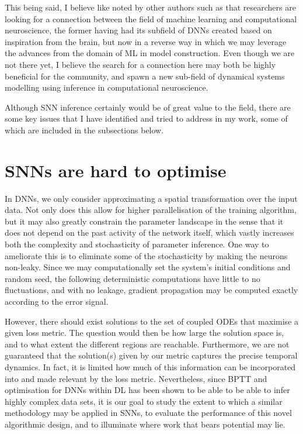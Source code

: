 \documentclass[mphil,deptreport,ai]{infthesis} %
\begin{document}
This being said, I believe like noted by other authors such as \cite{Sindaci2018StatisticalFunction} that researchers are looking for a connection between the field of machine learning and computational neuroscience, the former having had its subfield of DNNs created based on inspiration from the brain, but now in a reverse way in which we may leverage the advances from the domain of ML in model construction.
Even though we are not there yet, I believe the search for a connection here may both be highly beneficial for the community, and spawn a new sub-field of dynamical systems modelling using inference in computational neuroscience.

Although SNN inference certainly would be of great value to the field, there are some key issues that I have identified and tried to address in my work, some of which are included in the subsections below.

\section{SNNs are hard to optimise}
In DNNs, we only consider approximating a spatial transformation over the input data. Not only does this allow for higher parallelisation of the training algorithm, but it may also greatly constrain the parameter landscape in the sense that it does not depend on the past activity of the network itself, which vastly increases both the complexity and stochasticity of parameter inference. 
One way to ameliorate this is to eliminate some of the stochasticity by making the neurons non-leaky. Since we may computationally set the system’s initial conditions and random seed, the following deterministic computations have little to no fluctuations, and with no leakage, gradient propagation may be computed exactly according to the error signal.

However, there should exist solutions to the set of coupled ODEs that maximise a given loss metric. The question would then be how large the solution space is, and to what extent the different regions are reachable. Furthermore, we are not guaranteed that the solution(s) given by our metric captures the precise temporal dynamics. In fact, it is limited how much of this information can be incorporated into and made relevant by the loss metric.
Nevertheless, since BPTT and optimisation for DNNs within DL has been shown to be able to be able to infer highly complex data sets, it is our goal to study the extent to which a similar methodology may be applied in SNNs, to evaluate the performance of this novel algorithmic design, and to illuminate where work that bears potential may lie.
\end{document}

